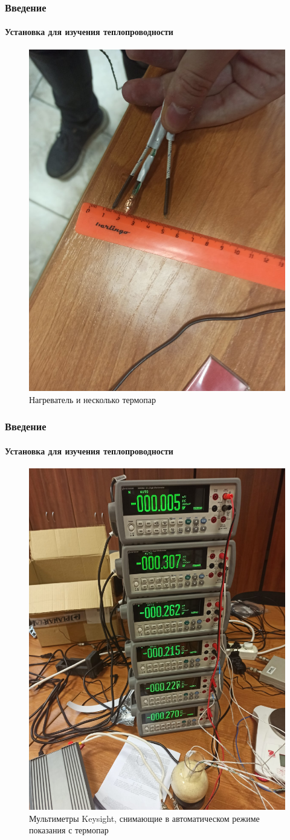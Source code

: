 \documentclass[8pt,pdf,hyperref={unicode}]{beamer}
\begin{document}
	\begin{frame}
		\frametitle{Введение}
		\framesubtitle{Установка для изучения теплопроводности}
		\begin{center}
			\begin{figure}[h!]
				\centering
				\includegraphics[width=.4\linewidth]{2.jpg}
				\caption{Нагреватель и несколько термопар}
				\label{fig2}
			\end{figure}
		\end{center}
	\end{frame}
	\begin{frame}
		\frametitle{Введение}
		\framesubtitle{Установка для изучения теплопроводности}
		\begin{center}
			\begin{figure}[h!]
				\centering
				\includegraphics[width=.4\linewidth]{3.jpg}
				\caption{Мультиметры Keysight, снимающие в автоматическом режиме показания с термопар}
				\label{fig3}
			\end{figure}
		\end{center}
	\end{frame}
\end{document}

